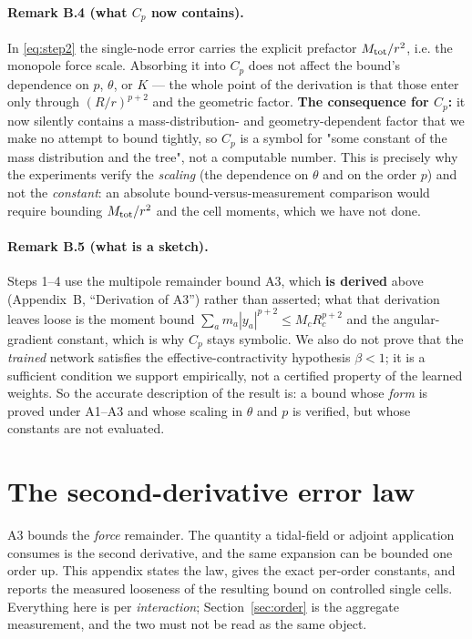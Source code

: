 \paragraph{Remark B.4 (what $C_p$ now contains).}
In \eqref{eq:step2} the single-node error carries the explicit prefactor
$M_{\rm tot}/r^{2}$, i.e. the monopole force scale. Absorbing it into $C_p$ does not affect
the bound's dependence on $p$, $\theta$, or $K$ --- the whole point of the derivation is
that those enter only through $(R/r)^{p+2}$ and the geometric factor. \textbf{The consequence
for $C_p$:} it now silently contains a mass-distribution- and geometry-dependent factor that
we make no attempt to bound tightly, so $C_p$ is a symbol for "some constant of the mass
distribution and the tree", not a computable number. This is precisely why the experiments
verify the \emph{scaling} (the dependence on $\theta$ and on the order $p$) and not the
\emph{constant}: an absolute bound-versus-measurement comparison would require bounding
$M_{\rm tot}/r^2$ and the cell moments, which we have not done.

\paragraph{Remark B.5 (what is a sketch).}
Steps 1--4 use the multipole remainder bound A3, which \textbf{is derived} above
(Appendix~B, ``Derivation of A3'') rather than asserted; what that derivation leaves loose is
the moment bound $\sum_a m_a|y_a|^{p+2}\le M_cR_c^{p+2}$ and the angular-gradient constant,
which is why $C_p$ stays symbolic. We also do not prove that the \emph{trained} network
satisfies the effective-contractivity hypothesis $\beta<1$; it is a sufficient condition we
support empirically, not a certified property of the learned weights. So the accurate
description of the result is: a bound whose \emph{form} is proved under A1--A3 and whose
scaling in $\theta$ and $p$ is verified, but whose constants are not evaluated.

\section{The second-derivative error law}\label{app:secondorder}
A3 bounds the \emph{force} remainder. The quantity a tidal-field or adjoint application consumes is
the second derivative, and the same expansion can be bounded one order up. This appendix states the
law, gives the exact per-order constants, and reports the measured looseness of the resulting bound
on controlled single cells. Everything here is per \emph{interaction}; Section~\ref{sec:order} is the
aggregate measurement, and the two must not be read as the same object.

